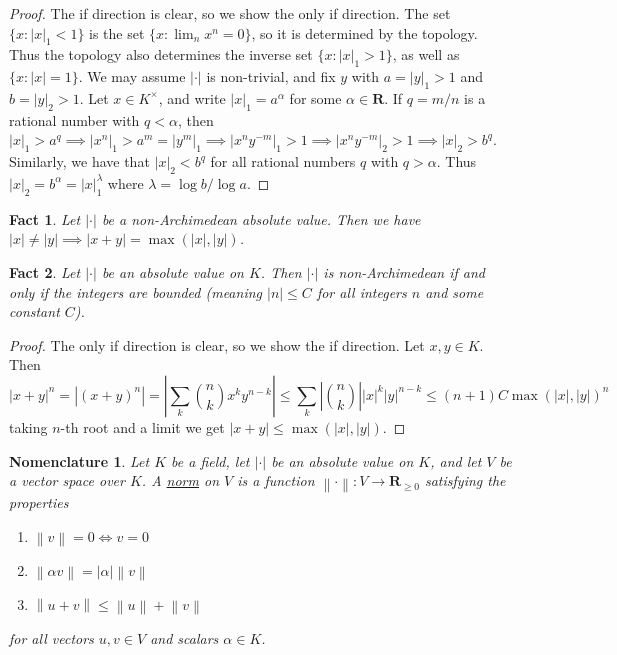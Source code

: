 \documentclass[12pt]{article}
\newtheorem*{fact*}{Fact}
\newtheorem*{nomn*}{Nomenclature}
\newcommand{\abs}[1]{\left\lvert#1\right\rvert}
\newcommand{\norm}[1]{\left\lVert#1\right\rVert}
\newcommand{\R}{\mathbf{R}}
\begin{document}
\begin{proof}
The if direction is clear, so we show the only if direction. The set $\{x:\abs{x}_1 < 1\}$ is the set $\{x : \lim_n x^n = 0\}$, so it is determined by the topology. Thus the topology also determines the inverse set $\{x : \abs{x}_1 > 1\}$, as well as $\{x:\abs{x} = 1\}$. We may assume $\abs{\cdot}$ is non-trivial, and fix $y$ with $a=\abs{y}_1 > 1$ and $b=\abs{y}_2 > 1$. Let $x\in K^\times$, and write $\abs{x}_1 = a^\alpha$ for some $\alpha\in\R$. If $q=m/n$ is a rational number with $q<\alpha$, then $\abs{x}_1 > a^q \implies \abs{x^n}_1 > a^m = \abs{y^m}_1\implies \abs{x^n y^{-m}}_1 > 1 \implies \abs{x^ny^{-m}}_2 > 1 \implies \abs{x}_2 > b^q$.
Similarly, we have that $\abs{x}_2 < b^q$ for all rational numbers $q$ with $q>\alpha$. Thus $\abs{x}_2 = b^\alpha = \abs{x}_1^{\lambda}$ where $\lambda=\log b / \log a$.
\end{proof}


\begin{fact*}
Let $\abs{\cdot}$ be a non-Archimedean absolute value. Then we have $\abs{x}\neq\abs{y} \implies \abs{x+y} = \max(\abs{x},\abs{y})$.
\end{fact*}


\begin{fact*}
Let $\abs{\cdot}$ be an absolute value on $K$. Then $\abs{\cdot}$ is non-Archimedean if and only if the integers are bounded (meaning $\abs{n} \le C$ for all integers $n$ and some constant $C$).
\end{fact*}


\begin{proof}
The only if direction is clear, so we show the if direction. Let $x,y\in K$. Then \[\abs{x+y}^n = \abs{(x+y)^n} = \abs{\sum_{k}\binom{n}{k}x^k y^{n-k}} \le \sum_k \abs{\binom{n}{k}}\abs{x}^k\abs{y}^{n-k} \le (n+1)C\max(\abs{x},\abs{y})^n\]
taking $n$-th root and a limit we get $\abs{x+y}\le \max(\abs{x},\abs{y})$.
\end{proof}


\begin{nomn*}
Let $K$ be a field, let $\abs{\cdot}$ be an absolute value on $K$, and let $V$ be a vector space over $K$. A \underline{norm} on $V$ is a function $\norm{\cdot}:V\to\R_{\ge0}$ satisfying the properties
\begin{enumerate}
    \item $\norm{v}=0 \iff v = 0$
    \item $\norm{\alpha v} = \abs{\alpha}\norm{v}$
    \item $\norm{u+v} \le \norm{u} + \norm{v}$
\end{enumerate}
for all vectors $u,v\in V$ and scalars $\alpha\in K$.
\end{nomn*}
\end{document}
